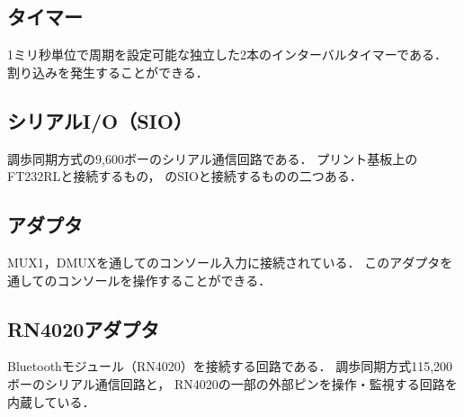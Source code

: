\subsection{タイマー}
1ミリ秒単位で周期を設定可能な独立した2本のインターバルタイマーである．
割り込みを発生することができる．

\subsection{シリアルI/O（SIO）}
調歩同期方式の9,600ボーのシリアル通信回路である．
プリント基板上のFT232RLと接続するもの，
{\tec}のSIOと接続するものの二つある．

\subsection{{\tec}アダプタ}
MUX1，DMUXを通して{\tec}のコンソール入力に接続されている．
このアダプタを通して{\tec}のコンソールを操作することができる．

\subsection{RN4020アダプタ}
Bluetoothモジュール（RN4020）を接続する回路である．
調歩同期方式115,200ボーのシリアル通信回路と，
RN4020の一部の外部ピンを操作・監視する回路を内蔵している．
